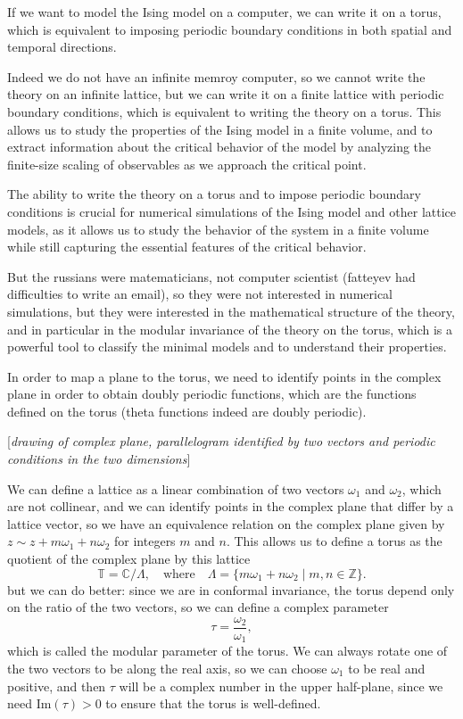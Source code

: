 \begin{example}
    If we want to model the Ising model on a computer, we can write it on a torus, which is equivalent to imposing periodic boundary conditions in both spatial and temporal directions.

    Indeed we do not have an infinite memroy computer, so we cannot write the theory on an infinite lattice, but we can write it on a finite lattice with periodic boundary conditions, which is equivalent to writing the theory on a torus. This allows us to study the properties of the Ising model in a finite volume, and to extract information about the critical behavior of the model by analyzing the finite-size scaling of observables as we approach the critical point.

    The ability to write the theory on a torus and to impose periodic boundary conditions is crucial for numerical simulations of the Ising model and other lattice models, as it allows us to study the behavior of the system in a finite volume while still capturing the essential features of the critical behavior.
\end{example}

But the russians were matematicians, not computer scientist (fatteyev had difficulties to write an email), so they were not interested in numerical simulations, but they were interested in the mathematical structure of the theory, and in particular in the modular invariance of the theory on the torus, which is a powerful tool to classify the minimal models and to understand their properties.

In order to map a plane to the torus, we need to identify points in the complex plane in order to obtain doubly periodic functions, which are the functions defined on the torus (theta functions indeed are doubly periodic).

    [\textit{drawing of complex plane, parallelogram identified by two vectors and periodic conditions in the two dimensions}]

We can define a lattice as a linear combination of two vectors \(\omega_1\) and \(\omega_2\), which are not collinear, and we can identify points in the complex plane that differ by a lattice vector, so we have an equivalence relation on the complex plane given by \(z \sim z + m\omega_1 + n\omega_2\) for integers \(m\) and \(n\). This allows us to define a torus as the quotient of the complex plane by this lattice
\[
    \mathbb{T} = \mathbb{C} / \Lambda, \quad \text{where} \quad \Lambda = \{ m\omega_1 + n\omega_2 \mid m,n \in \mathbb{Z} \}.
\]
but we can do better: since we are in conformal invariance, the torus depend only on the ratio of the two vectors, so we can define a complex parameter
\[
    \tau = \frac{\omega_2}{\omega_1},
\]
which is called the modular parameter of the torus. We can always rotate one of the two vectors to be along the real axis, so we can choose \(\omega_1\) to be real and positive, and then \(\tau\) will be a complex number in the upper half-plane, since we need \(\mathrm{Im}(\tau) > 0\) to ensure that the torus is well-defined.

